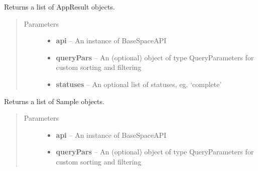 \documentclass[letterpaper,10pt,english]{sphinxmanual}
\begin{document}
\begin{fulllineitems}
\begin{fulllineitems}
\begin{quote}
\begin{description}
\end{description}\end{quote}

\end{fulllineitems}


\begin{fulllineitems}
\label{Available modules:BaseSpacePy.model.Project.Project.getAppResults}
Returns a list of AppResult objects.
\begin{quote}\begin{description}
\item[{Parameters}] \leavevmode\begin{itemize}
\item {} 
\textbf{api} -- An instance of BaseSpaceAPI

\item {} 
\textbf{queryPars} -- An (optional) object of type QueryParameters for custom sorting and filtering

\item {} 
\textbf{statuses} -- An optional list of statuses, eg. `complete'

\end{itemize}

\end{description}\end{quote}

\end{fulllineitems}


\begin{fulllineitems}
\label{Available modules:BaseSpacePy.model.Project.Project.getSamples}
Returns a list of Sample objects.
\begin{quote}\begin{description}
\item[{Parameters}] \leavevmode\begin{itemize}
\item {} 
\textbf{api} -- An instance of BaseSpaceAPI

\item {} 
\textbf{queryPars} -- An (optional) object of type QueryParameters for custom sorting and filtering


\end{itemize}
\end{description}
\end{quote}
\end{fulllineitems}
\end{fulllineitems}
\end{document}
